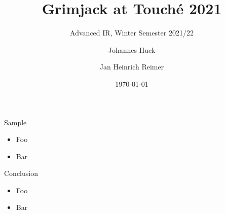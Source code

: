 \documentclass[english]{mlutalk}
\title{Grimjack at Touché 2021}
\subtitle{Advanced IR, Winter Semester 2021/22}
\author{Johannes Huck \and Jan Heinrich Reimer}
\institute{Martin Luther University Halle-Wittenberg}
\date{\today}
\begin{document}
\titleframe

\begin{frame}{Sample}  
  \begin{itemize}
    \item Foo
    \item Bar
  \end{itemize}
\end{frame}

\begin{frame}{Conclusion}
  \begin{itemize}
    \item Foo
    \item Bar
  \end{itemize}
  \thankyou
\end{frame}

\appendix
\section{\appendixname}

\bibliographyframe
\end{document}
